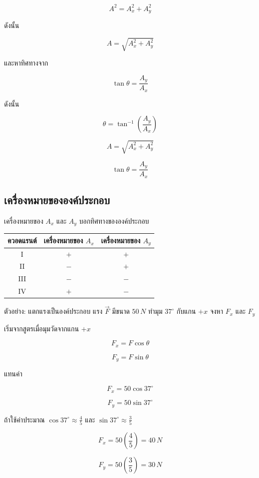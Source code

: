 \documentclass[12pt,a4paper]{report}
\begin{document}
\[
A^2=A_x^2+A_y^2
\]

ดังนั้น

\[
A=\sqrt{A_x^2+A_y^2}
\]

และหาทิศทางจาก

\[
\tan\theta=\frac{A_y}{A_x}
\]

ดังนั้น

\[
\theta=\tan^{-1}\left(\frac{A_y}{A_x}\right)
\]

\begin{tcolorbox}[title=สูตรหาขนาดและทิศจากองค์ประกอบ]
\[
A=\sqrt{A_x^2+A_y^2}
\]

\[
\tan\theta=\frac{A_y}{A_x}
\]
\end{tcolorbox}

\subsection{เครื่องหมายขององค์ประกอบ}

เครื่องหมายของ $A_x$ และ $A_y$ บอกทิศทางขององค์ประกอบ

\begin{center}
\begin{tabular}{|c|c|c|}
\hline
\textbf{ควอดแรนต์} & \textbf{เครื่องหมายของ $A_x$} & \textbf{เครื่องหมายของ $A_y$} \\
\hline
I & $+$ & $+$ \\
\hline
II & $-$ & $+$ \\
\hline
III & $-$ & $-$ \\
\hline
IV & $+$ & $-$ \\
\hline
\end{tabular}
\end{center}

\begin{examplebox}{ตัวอย่าง: แตกแรงเป็นองค์ประกอบ}
แรง $\vec{F}$ มีขนาด $50\,\si{N}$ ทำมุม $37^\circ$ กับแกน $+x$ จงหา $F_x$ และ $F_y$

เริ่มจากสูตรเมื่อมุมวัดจากแกน $+x$

\[
F_x=F\cos\theta
\]

\[
F_y=F\sin\theta
\]

แทนค่า

\[
F_x=50\cos37^\circ
\]

\[
F_y=50\sin37^\circ
\]

ถ้าใช้ค่าประมาณ $\cos37^\circ\approx \frac{4}{5}$ และ $\sin37^\circ\approx \frac{3}{5}$

\[
F_x=50\left(\frac{4}{5}\right)=40\,\si{N}
\]

\[
F_y=50\left(\frac{3}{5}\right)=30\,\si{N}
\]
\end{examplebox}
\end{document}
